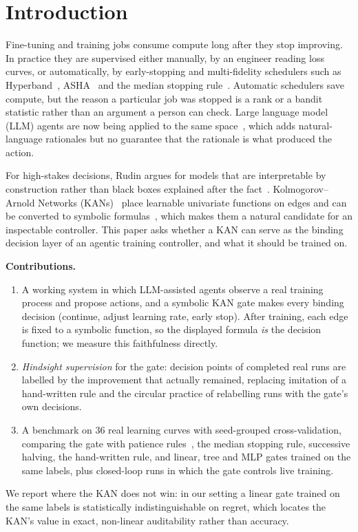 \documentclass[conference]{IEEEtran}
\begin{document}
\section{Introduction}
Fine-tuning and training jobs consume compute long after they stop improving. In practice they are supervised either manually, by an engineer reading loss curves, or automatically, by early-stopping and multi-fidelity schedulers such as Hyperband~\cite{li2018hyperband}, ASHA~\cite{li2020asha} and the median stopping rule~\cite{golovin2017vizier}. Automatic schedulers save compute, but the reason a particular job was stopped is a rank or a bandit statistic rather than an argument a person can check. Large language model (LLM) agents are now being applied to the same space~\cite{zhang2023llmhpo,liu2024agenthpo,huang2024mlagentbench}, which adds natural-language rationales but no guarantee that the rationale is what produced the action.

For high-stakes decisions, Rudin argues for models that are interpretable by construction rather than black boxes explained after the fact~\cite{rudin2019stop}. Kolmogorov--Arnold Networks (KANs)~\cite{liu2025kan} place learnable univariate functions on edges and can be converted to symbolic formulas~\cite{liu2024kan2}, which makes them a natural candidate for an inspectable controller. This paper asks whether a KAN can serve as the binding decision layer of an agentic training controller, and what it should be trained on.

\textbf{Contributions.}
\begin{enumerate}
\item A working system in which LLM-assisted agents observe a real training process and propose actions, and a symbolic KAN gate makes every binding decision (continue, adjust learning rate, early stop). After training, each edge is fixed to a symbolic function, so the displayed formula \emph{is} the decision function; we measure this faithfulness directly.
\item \emph{Hindsight supervision} for the gate: decision points of completed real runs are labelled by the improvement that actually remained, replacing imitation of a hand-written rule and the circular practice of relabelling runs with the gate's own decisions.
\item A benchmark on 36 real learning curves with seed-grouped cross-validation, comparing the gate with patience rules~\cite{prechelt2012early}, the median stopping rule, successive halving, the hand-written rule, and linear, tree and MLP gates trained on the same labels, plus closed-loop runs in which the gate controls live training.
\end{enumerate}
We report where the KAN does not win: in our setting a linear gate trained on the same labels is statistically indistinguishable on regret, which locates the KAN's value in exact, non-linear auditability rather than accuracy.
\end{document}
